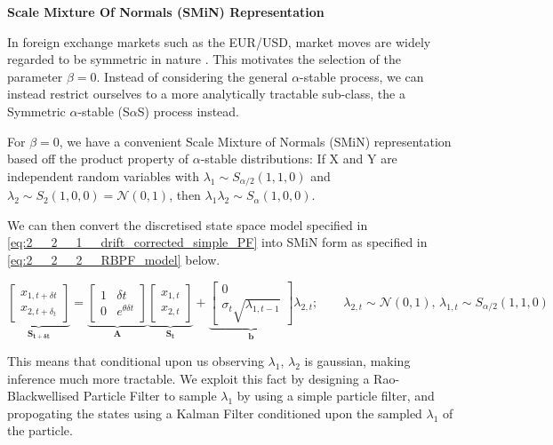 \documentclass[../main.tex]{subfiles}
\begin{document}
\textbf{Scale Mixture Of Normals (SMiN) Representation}

In foreign exchange markets such as the EUR/USD, market moves are widely regarded to be symmetric in nature \cite{tankov2003financial}. This motivates the selection of the parameter $\beta = 0$. Instead of considering the general $\alpha$-stable process, we can instead restrict ourselves to a more analytically tractable sub-class, the a Symmetric $\alpha$-stable (S$\alpha$S) process instead.

For $\beta = 0$, we have a convenient Scale Mixture of Normals (SMiN) representation based off the product property of $\alpha$-stable distributions: If X and Y are independent random variables with $\lambda_1 \sim S_{\alpha/2}(1, 1, 0)$ and $\lambda_2 \sim S_2(1,0,0) = \mathcal{N}(0,1)$, then $\lambda_1 \lambda_2 \sim S_\alpha(1, 0, 0)$.

We can then convert the discretised state space model specified in \autoref{eq:2__2__1__drift_corrected_simple_PF} into SMiN form as specified in \autoref{eq:2__2__2__RBPF_model} below.

\begin{equation}
    \underbrace{
        \begin{bmatrix}
        x_{1,t+\delta t} \\ x_{2,t + \delta_t}
        \end{bmatrix}
    }_{\mathbf{S_{t + \delta t}}}
    =
    \underbrace{
        \begin{bmatrix}
        1 & \delta t \\ 0 & e^{\theta \delta t}
        \end{bmatrix}
    }_{\mathbf{A}}
    \underbrace{
        \begin{bmatrix}
        x_{1,t} \\ x_{2,t}
        \end{bmatrix}
    }_{\mathbf{S_t}}
    + 
    \underbrace{
        \begin{bmatrix}
        0 \\ \sigma_t \sqrt{\lambda_{1, t-1}}
        \end{bmatrix}
    }_{\mathbf{b}} \lambda_{2, t};
    \qquad \lambda_{2,t} \sim \mathcal{N}(0,1) \text{,   } \lambda_{1,t} \sim S_{\alpha/2}(1,1,0)
    \label{eq:2__2__2__RBPF_model}
\end{equation}

This means that conditional upon us observing $\lambda_1$, $\lambda_2$ is gaussian, making inference much more tractable. We exploit this fact by designing a Rao-Blackwellised Particle Filter to sample $\lambda_1$ by using a simple particle filter, and propogating the states using a Kalman Filter conditioned upon the sampled $\lambda_1$ of the particle. 
\end{document}
